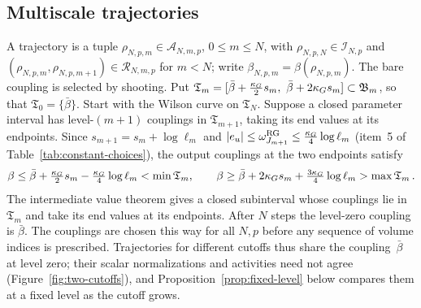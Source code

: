 \subsection{Multiscale trajectories}\label{sec:trajectories}

A trajectory is a tuple $\rho_{N,p,m}\in\mathcal A_{N,m,p}$, $0\le m\le N$, with $\rho_{N,p,N}\in\mathcal I_{N,p}$ and $(\rho_{N,p,m},\rho_{N,p,m+1})\in\mathcal R_{N,m,p}$ for $m<N$; write $\beta_{N,p,m}=\beta(\rho_{N,p,m})$. The bare coupling is selected by shooting. Put $\mathfrak T_m=[\bar\beta+\tfrac{\slope}2s_m,\ \bar\beta+2\slope s_m]\subset\mathfrak B_m$, so that $\mathfrak T_0=\{\bar\beta\}$. Start with the Wilson curve on $\mathfrak T_N$. Suppose a closed parameter interval has level-$(m+1)$ couplings in $\mathfrak T_{m+1}$, taking its end values at its endpoints. Since $s_{m+1}=s_m+\log\ell_m$ and $|e_u|\le\omega^{\rm RG}_{J_{m+1}}\le\tfrac{\kappa_G}4\log\ell_m$ (item~5 of Table~\ref{tab:constant-choices}), the output couplings at the two endpoints satisfy
\begin{equation*}
\beta\le\bar\beta+\tfrac{\kappa_G}2s_m-\tfrac{\kappa_G}4\log\ell_m<\min\mathfrak T_m,\qquad
\beta\ge\bar\beta+2\kappa_G s_m+\tfrac{3\kappa_G}4\log\ell_m>\max\mathfrak T_m\,.
\end{equation*}
The intermediate value theorem gives a closed subinterval whose couplings lie in $\mathfrak T_m$ and take its end values at its endpoints. After $N$ steps the level-zero coupling is $\bar\beta$. The couplings are chosen this way for all $N,p$ before any sequence of volume indices is prescribed. Trajectories for different cutoffs thus share the coupling~$\bar\beta$ at level zero; their scalar normalizations and activities need not agree (Figure~\ref{fig:two-cutoffs}), and Proposition~\ref{prop:fixed-level} below compares them at a fixed level as the cutoff grows.

